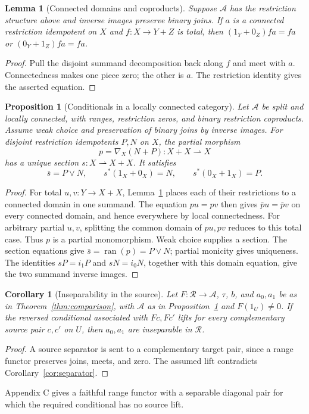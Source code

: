 \documentclass[11pt]{article}
\newtheorem{lemma}[theorem]{Lemma}
\newtheorem{proposition}[theorem]{Proposition}
\newtheorem{corollary}[theorem]{Corollary}
\theoremstyle{definition}\newtheorem{definition}[theorem]{Definition}
\newcommand{\ran}{\operatorname{ran}}
\newcommand{\R}{\mathscr R}
\newcommand{\A}{\mathcal A}
\begin{document}
\begin{lemma}[Connected domains and coproducts]\label{lem:connected}
Suppose $\A$ has the restriction structure above and inverse images
preserve binary joins. If $a$ is a connected restriction idempotent
on $X$ and $f:X\to Y+Z$ is total, then
$(1_Y+0_Z)fa=fa$ or $(0_Y+1_Z)fa=fa$.
\end{lemma}
\begin{proof}
Pull the disjoint summand decomposition back along $f$ and meet
with $a$. Connectedness makes one piece zero; the other is $a$.
The restriction identity gives the asserted equation.
\end{proof}

\begin{proposition}[Conditionals in a locally connected category]\label{prop:conditionals}
Let $\A$ be split and locally connected, with ranges, restriction
zeros, and binary restriction coproducts. Assume weak choice and
preservation of binary joins by inverse images. For disjoint
restriction idempotents $P,N$ on $X$, the partial morphism
\[
 p=\nabla_X(N+P):X+X\rightharpoonup X
\]
has a unique section $s:X\rightharpoonup X+X$. It satisfies
\[
 \bar s=P\vee N,\qquad
 s^*(1_X+0_X)=N,\qquad s^*(0_X+1_X)=P.
\]
\end{proposition}
\begin{proof}
For total $u,v:Y\to X+X$, Lemma~\ref{lem:connected} places each
of their restrictions to a connected domain in one summand.
The equation $pu=pv$ then gives $\bar p u=\bar p v$ on every
connected domain, and hence everywhere by local connectedness.
For arbitrary partial $u,v$, splitting the common domain of $pu,pv$
reduces to this total case. Thus $p$ is a partial monomorphism.
Weak choice supplies a section. The section equations
give $\bar s=\ran(p)=P\vee N$; partial monicity gives uniqueness.
The identities $sP=i_1P$ and $sN=i_0N$, together with this domain
equation, give the two summand inverse images.
\end{proof}

\begin{corollary}[Inseparability in the source]\label{cor:source}
Let $F:\R\to\A$, $\tau$, $b$, and $a_0,a_1$ be as in
Theorem~\ref{thm:comparison}, with $\A$ as in
Proposition~\ref{prop:conditionals} and $F(1_U)\ne0$.
If the reversed conditional associated with $Fc,Fc'$ lifts for every
complementary source pair $c,c'$ on $U$, then $a_0,a_1$ are inseparable
in $\R$.
\end{corollary}
\begin{proof}
A source separator is sent to a complementary target pair, since
a range functor preserves joins, meets, and zero. The assumed lift
contradicts Corollary~\ref{cor:separator}.
\end{proof}
Appendix C gives a faithful range functor with a separable diagonal
pair for which the required conditional has no source lift.
\end{document}
